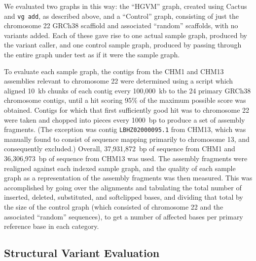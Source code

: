 We evaluated two graphs in this way: the ``HGVM'' graph, created using Cactus and \texttt{vg add}, as described above, and a ``Control'' graph, consisting of just the chromosome 22 GRCh38 scaffiold and associated ``random'' scaffolds, with no variants added. Each of these gave rise to one actual sample graph, produced by the variant caller, and one control sample graph, produced by passing through the entire graph under test as if it were the sample graph.

To evaluate each sample graph, the contigs from the CHM1 and CHM13 assemblies relevant to chromosome 22 were determined using a script which aligned 10~kb chunks of each contig every 100,000~kb to the 24 primary GRCh38 chromosome contigs, until a hit scoring 95\% of the maximum possible score was obtained. Contigs for which that first sufficiently good hit was to chromosome 22 were taken and chopped into pieces every 1000~bp to produce a set of assembly fragments. (The exception was contig \texttt{LBHZ02000095.1} from CHM13, which was manually found to consist of sequence mapping primarily to chromosome 13, and consequently excluded.) Overall, 37,931,872~bp of sequence from CHM1 and 36,306,973~bp of sequence from CHM13 was used. The assembly fragments were realigned against each indexed sample graph, and the quality of each sample graph as a representation of the assembly fragments was then measured. This was accomplished by going over the alignments and tabulating the total number of inserted, deleted, substituted, and softclipped bases, and dividing that total by the size of the control graph (which consisted of chromosome 22 and the associated ``random'' sequences), to get a number of affected bases per primary reference base in each category.

\subsection{Structural Variant Evaluation}

